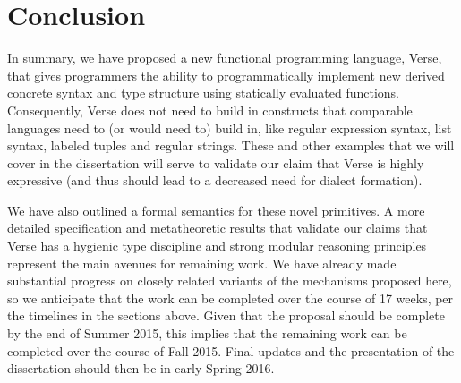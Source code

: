 \section{Conclusion}
In summary, we have proposed a new functional programming language, Verse, that gives programmers the ability to programmatically implement new derived concrete syntax and type structure using statically evaluated functions. Consequently, Verse does not need to build in constructs that comparable languages need to (or would need to) build in, like regular expression syntax, list syntax, labeled tuples and regular strings. These and other examples that we will cover in the dissertation will serve to validate our claim that Verse is highly expressive (and thus should lead to a decreased need for dialect formation).

We have also outlined a formal semantics for these novel primitives. A more detailed specification and metatheoretic results that validate our claims that Verse has a hygienic type discipline and strong modular reasoning principles represent the main avenues for remaining work. We have already made substantial progress on closely related variants of the mechanisms proposed here, so we anticipate that the work can be completed over the course of 17 weeks, per the timelines in the sections above. Given that the proposal should be complete by the end of Summer 2015, this implies that the remaining work can be completed over the course of Fall 2015. Final updates and the presentation of the dissertation should then be in early Spring 2016.





